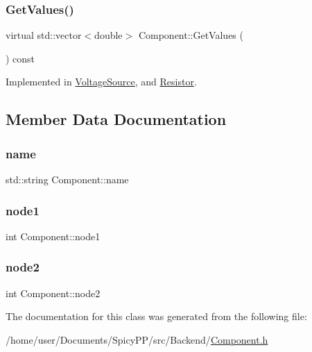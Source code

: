 \subsubsection{\texorpdfstring{Get\+Values()}{GetValues()}}
{\footnotesize\ttfamily virtual std\+::vector$<$double$>$ Component\+::\+Get\+Values (\begin{DoxyParamCaption}{ }\end{DoxyParamCaption}) const\hspace{0.3cm}{\ttfamily [pure virtual]}}



Implemented in \hyperlink{classVoltageSource_a60bb1c5c07f668854a817d626f220f84}{Voltage\+Source}, and \hyperlink{classResistor_ad4d08c34efa99287438aac338d7012d7}{Resistor}.



\subsection{Member Data Documentation}
\mbox{\label{classComponent_a46343549452bda5ee9752f7a9bc15efb}} 
\subsubsection{\texorpdfstring{name}{name}}
{\footnotesize\ttfamily std\+::string Component\+::name\hspace{0.3cm}{\ttfamily [private]}}

\mbox{\label{classComponent_a7d8cd23c0aaff5c139b825e77c0b2051}} 
\subsubsection{\texorpdfstring{node1}{node1}}
{\footnotesize\ttfamily int Component\+::node1\hspace{0.3cm}{\ttfamily [private]}}

\mbox{\label{classComponent_af96df64e1eb5fac7dae7c674cac3d31e}} 
\subsubsection{\texorpdfstring{node2}{node2}}
{\footnotesize\ttfamily int Component\+::node2\hspace{0.3cm}{\ttfamily [private]}}



The documentation for this class was generated from the following file\+:\begin{DoxyCompactItemize}
\item 
/home/user/\+Documents/\+Spicy\+P\+P/src/\+Backend/\hyperlink{Component_8h}{Component.\+h}\end{DoxyCompactItemize}
